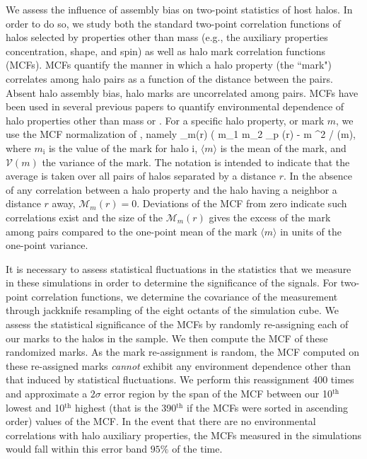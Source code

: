 \documentclass[usenatbib,usegraphicx,letterpaper]{mn2e}
\begin{document}
We assess the influence of assembly bias on two-point statistics of host halos. In order to do so, we 
study both the standard two-point correlation functions of halos selected by properties other than mass 
(e.g., the auxiliary properties concentration, shape, and spin) as well as halo mark correlation functions (MCFs). 
MCFs quantify the manner in which a halo property (the ``mark") correlates among halo pairs as a function of 
the distance between the pairs. Absent halo assembly bias, halo marks are uncorrelated among pairs. 
MCFs have been used in several previous papers to quantify environmental dependence of halo 
properties other than mass \citet{wechsler06} or \citet{harker06} . 
For a specific halo property, or mark $m$, we use the MCF normalization of \citet{wechsler06}, namely 
\beq
{}_m(r) \equiv ( \langle m_1 m_2 \rangle_p (r) - \langle m \rangle^2 / (m),
\eeq
where $m_{\mathrm{i}}$ is the value of the mark for halo $\mathrm{i}$, $\langle m \rangle$ is the mean of the mark, 
and $\mathcal{V}(m)$ the variance of the mark. The notation is intended to indicate that the average is taken over all 
pairs of halos separated by a distance $r$. In the absence of any correlation between a halo property and the halo 
having a neighbor a distance $r$ away, $\mathcal{M}_m(r) = 0$. Deviations of the MCF from zero indicate 
such correlations exist and the size of the $\mathcal{M}_m(r)$ gives the excess of the mark among pairs 
compared to the one-point mean of the mark $\langle m\rangle$ in units of the one-point variance.


It is necessary to assess statistical fluctuations in the statistics that we measure in these simulations in order to 
determine the significance of the signals. For two-point correlation functions, we determine the covariance of 
the measurement through jackknife resampling of the eight octants of the simulation cube. We assess the 
statistical significance of the MCFs by randomly re-assigning each of our marks to the halos in the sample. 
We then compute the MCF of these randomized marks. As the mark re-assignment is random, 
the MCF computed on these re-assigned marks {\em cannot} exhibit any 
environment dependence other than that induced by statistical fluctuations. 
We perform this reassignment 400 times and approximate a $2\sigma$ error region by 
the span of the MCF between our 10$^\mathrm{th}$ lowest and 10$^\mathrm{th}$ highest (that is the 390$^\mathrm{th}$ 
if the MCFs were sorted in ascending order) values of the MCF. In the event that there are no environmental 
correlations with halo auxiliary properties, the MCFs measured in the simulations would fall within this error 
band $95\%$ of the time. 
\end{document}
